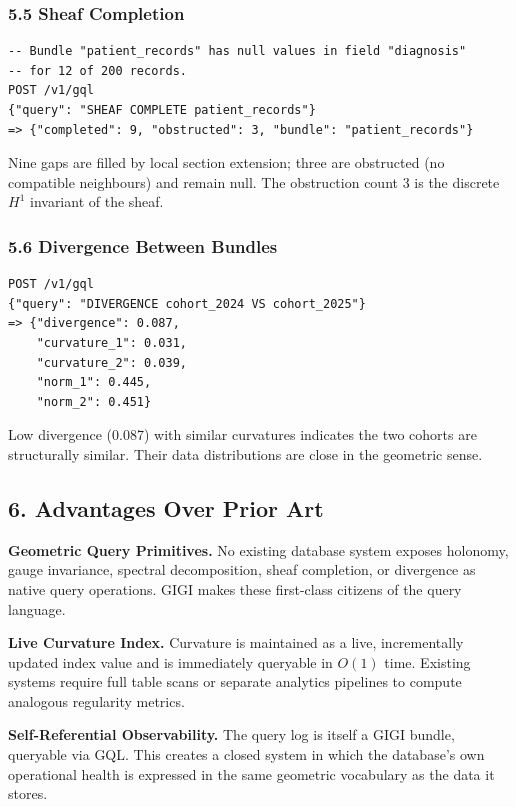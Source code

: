 \documentclass[11pt,letterpaper]{article}
\begin{document}
\subsubsection*{5.5 Sheaf Completion}

\begin{lstlisting}
-- Bundle "patient_records" has null values in field "diagnosis"
-- for 12 of 200 records.
POST /v1/gql
{"query": "SHEAF COMPLETE patient_records"}
=> {"completed": 9, "obstructed": 3, "bundle": "patient_records"}
\end{lstlisting}

Nine gaps are filled by local section extension; three are obstructed (no compatible neighbours) and remain null. The obstruction count 3 is the discrete $H^1$ invariant of the sheaf.


\subsubsection*{5.6 Divergence Between Bundles}

\begin{lstlisting}
POST /v1/gql
{"query": "DIVERGENCE cohort_2024 VS cohort_2025"}
=> {"divergence": 0.087,
    "curvature_1": 0.031,
    "curvature_2": 0.039,
    "norm_1": 0.445,
    "norm_2": 0.451}
\end{lstlisting}

Low divergence (0.087) with similar curvatures indicates the two cohorts are structurally similar. Their data distributions are close in the geometric sense.


\subsection*{6. Advantages Over Prior Art}

\textbf{Geometric Query Primitives.} No existing database system exposes holonomy, gauge invariance, spectral decomposition, sheaf completion, or divergence as native query operations. GIGI makes these first-class citizens of the query language.

\textbf{Live Curvature Index.} Curvature is maintained as a live, incrementally updated index value and is immediately queryable in $O(1)$ time. Existing systems require full table scans or separate analytics pipelines to compute analogous regularity metrics.

\textbf{Self-Referential Observability.} The query log is itself a GIGI bundle, queryable via GQL. This creates a closed system in which the database's own operational health is expressed in the same geometric vocabulary as the data it stores.
\end{document}

